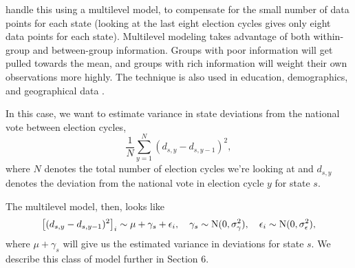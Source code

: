 \documentclass[thesis.tex]{subfiles}
\begin{document}
\cite{Lock:2010aa} handle this using a multilevel model, to compensate for the small number of data points for each state (looking at the last eight election cycles gives only eight data points for each state). Multilevel modeling takes advantage of both within-group and between-group information. Groups with poor information will get pulled towards the mean, and groups with rich information will weight their own observations more highly. The technique is also used in education, demographics, and geographical data \citep{Ghitza:2013aa,Gelman:2006aa,Aitkin:1981aa}.

In this case, we want to estimate variance in state deviations from the national vote between election cycles, \[
  \frac{1}{N}\sum_{y=1}^N (d_{s, y} - d_{s, y - 1})^2,
\] where \(N\) denotes the total number of election cycles we're looking at and \(d_{s, y}\) denotes the deviation from the national vote in election cycle \(y\) for state \(s\).

The multilevel model, then, looks like \begin{equation*}
	\left[(d_{s, y} - d_{s, y - 1})^2\right]_i \sim \mu + \gamma_s + \epsilon_i, \quad
	\gamma_s \sim \operatorname{N}(0, \sigma_\gamma^2), \quad
	\epsilon_i \sim \operatorname{N}(0, \sigma_\epsilon^2),
\end{equation*} where \(\mu + \gamma_s\) will give us the estimated variance in deviations for state \(s\). We describe this class of model further in Section 6.

\end{document}
